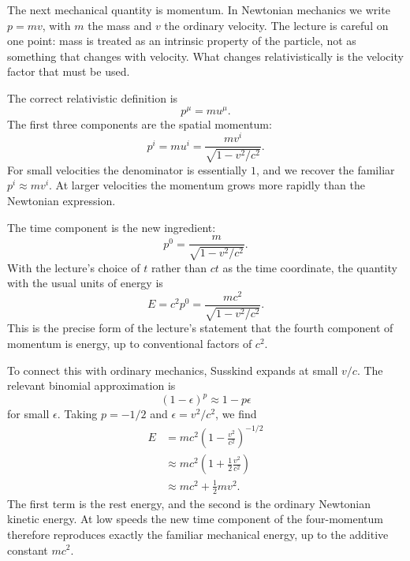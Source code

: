 The next mechanical quantity is momentum. In Newtonian mechanics we write \(p=mv\), with \(m\) the mass and \(v\) the ordinary velocity. The lecture is careful on one point: mass is treated as an intrinsic property of the particle, not as something that changes with velocity. What changes relativistically is the velocity factor that must be used.

The correct relativistic definition is
\begin{equation}
p^\mu = m u^\mu.
\end{equation}
The first three components are the spatial momentum:
\begin{equation}
p^i = m u^i = \frac{m v^i}{\sqrt{1-v^2/c^2}}.
\end{equation}
For small velocities the denominator is essentially \(1\), and we recover the familiar \(p^i\approx mv^i\). At larger velocities the momentum grows more rapidly than the Newtonian expression.

The time component is the new ingredient:
\begin{equation}
p^0 = \frac{m}{\sqrt{1-v^2/c^2}}.
\end{equation}
With the lecture's choice of \(t\) rather than \(ct\) as the time coordinate, the quantity with the usual units of energy is
\begin{equation}
E=c^2p^0=\frac{mc^2}{\sqrt{1-v^2/c^2}}.
\end{equation}
This is the precise form of the lecture's statement that the fourth component of momentum is energy, up to conventional factors of \(c^2\).

To connect this with ordinary mechanics, Susskind expands at small \(v/c\). The relevant binomial approximation is
\begin{equation}
(1-\epsilon)^p \approx 1-p\epsilon
\end{equation}
for small \(\epsilon\). Taking \(p=-1/2\) and \(\epsilon=v^2/c^2\), we find
\begin{align}
E
&=mc^2\left(1-\frac{v^2}{c^2}\right)^{-1/2} \\
&\approx mc^2\left(1+\frac{1}{2}\frac{v^2}{c^2}\right) \\
&\approx mc^2+\frac{1}{2}mv^2.
\end{align}
The first term is the rest energy, and the second is the ordinary Newtonian kinetic energy. At low speeds the new time component of the four-momentum therefore reproduces exactly the familiar mechanical energy, up to the additive constant \(mc^2\).


